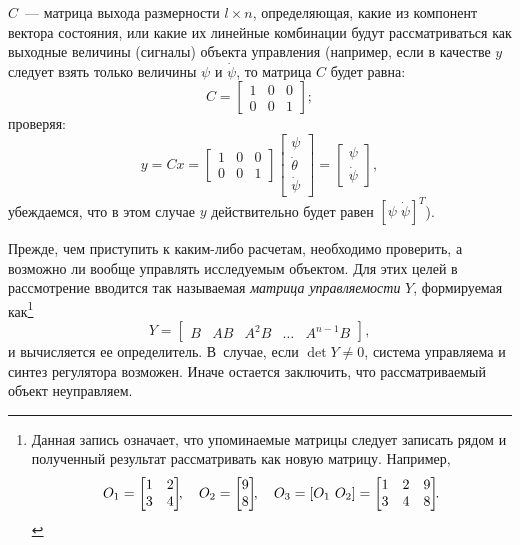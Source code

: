 \documentclass[12pt,a4paper,openany]{extarticle}
\begin{document}
$C$~--- матрица выхода размерности $l\times n$, определяющая, какие из компонент вектора состояния, или какие их линейные комбинации будут рассматриваться как выходные величины (сигналы) объекта управления (например, если в качестве $y$ следует взять только величины $\psi$ и $\dot\psi$, то матрица $C$ будет равна:
\begin{equation}
	C = 
	\begin{bmatrix}
		1 & 0 & 0\\
		0 & 0 & 1
	\end{bmatrix}\!\!;
\end{equation}
проверяя:
\begin{equation}
y = Cx = 
\begin{bmatrix}
		1 & 0 & 0\\
		0 & 0 & 1
\end{bmatrix}
\begin{bmatrix}
\psi \\ \dot\theta \\ \dot\psi
\end{bmatrix}
=
\begin{bmatrix}
\psi  \\ \dot\psi
\end{bmatrix}\!\!,
\end{equation}
убеждаемся, что в этом случае $y$ действительно будет равен $[\psi\;\dot\psi]^T$).

Прежде, чем приступить к каким-либо расчетам, необходимо проверить, а возможно ли вообще управлять исследуемым объектом.
Для этих целей в рассмотрение вводится так называемая \textit{матрица управляемости} $Y$\!, формируемая как\footnote{Данная запись означает, что упоминаемые матрицы следует записать рядом и полученный результат рассматривать как новую матрицу.
Например,
\begin{equation*}
	O_1=
	\begin{bmatrix}
		1 & 2\\
		3 & 4
	\end{bmatrix}\!\!,\quad
	O_2=
	\begin{bmatrix}
		9\\
		8 
	\end{bmatrix}\!\!,\quad
	O_3 = [O_1\ O_2] =
	\begin{bmatrix}
		1 & 2 & 9\\
		3 & 4 & 8
	\end{bmatrix}\!\!\ldotp
\end{equation*}}
\begin{equation}
	Y = 
	\begin{bmatrix}
		B & AB & A^2B & \dots & A^{n-1}B
	\end{bmatrix}\!\!,	 
\end{equation}
и вычисляется ее определитель. 
В~случае, если $\det Y\ne0$, система управляема и синтез регулятора возможен. 
Иначе остается заключить, что рассматриваемый объект неуправляем.
\end{document}
